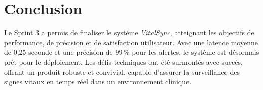 \section*{Conclusion}
Le Sprint 3 a permis de finaliser le système \textit{VitalSync}, atteignant les objectifs de performance, de précision et de satisfaction utilisateur. Avec une latence moyenne de 0,25 seconde et une précision de 99\,\% pour les alertes, le système est désormais prêt pour le déploiement. Les défis techniques ont été surmontés avec succès, offrant un produit robuste et convivial, capable d’assurer la surveillance des signes vitaux en temps réel dans un environnement clinique.
